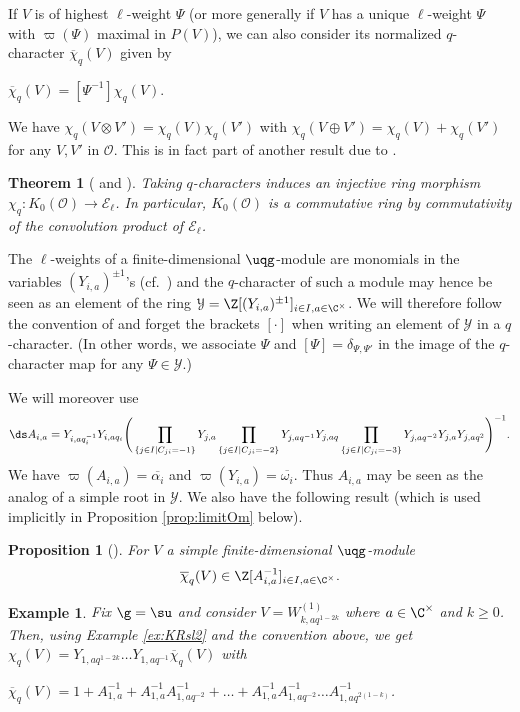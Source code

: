 \documentclass[11pt]{amsart}
\newtheorem{prop}[theorem]{Proposition}
\newtheorem{thm}[theorem]{Theorem}
\newtheorem{example}[theorem]{Example}
\theoremstyle{definition}
\theoremstyle{remark}
\numberwithin{equation}{section}
\begin{document}
If $V$ is of highest $\ell$-weight $\Psi$ (or more generally if $V$ has a unique $\ell$-weight $\Psi$ with $\varpi(\Psi)$ maximal in $P(V)$), we can also consider its normalized $q$-character $\overline{\chi}_q(V)$ given by
\begin{center}
$\overline{\chi}_q(V) = [\Psi^{-1}]\chi_q(V)$.
\end{center}
We have $\chi_q(V\otimes V') = \chi_q(V)\chi_q(V')$ with $\chi_q(V\oplus V') = \chi_q(V)+\chi_q(V')$ for any $V,V'$ in $\mathcal{O}$. This is in fact part of another result due to \cite{hj}.
\begin{thm}[{\cite[Proposition 3.12]{hj}} and {\cite[Theorem 3]{fr}}]\label{thm:qcaract} Taking $q$-characters induces an injective ring morphism $\chi_q : K_0(\mathcal{O}) \rightarrow \mathcal{E}_{\ell}$. In particular, $K_0(\mathcal{O})$ is a commutative ring by commutativity of the convolution product of $\mathcal{E}_{\ell}$.
\end{thm}
The $\ell$-weights of a finite-dimensional $\uqg$-module are monomials in the variables $(Y_{i,a})^{\pm 1}$'s (cf.~\cite{fr}) and the $q$-character of such a module may hence be seen as an element of the ring $\mathcal{Y}=\Z[(Y_{i,a})^{\pm 1}]_{i\in I,a\in \C^{\times}}$. We will therefore follow the convention of \cite{hj,fh1,hl2} and forget the brackets $[\cdot]$ when writing an element of $\mathcal{Y}$ in a $q$-character. (In other words, we associate $\Psi$ and $[\Psi] = \delta_{\Psi,\Psi'}$ in the image of the $q$-character map for any $\Psi \in \mathcal{Y}$.) \par We will moreover use 
$$\ds A_{i,a} = Y_{i,aq_i^{-1}}Y_{i,aq_i}\Bigg(\prod_{\{j\in I| C_{ji}=-1\}} Y_{j,a}\prod_{\{j\in I|C_{ji}=-2\}} Y_{j,aq^{-1}}Y_{j,aq}\prod_{\{j\in I|C_{ji}=-3\}} Y_{j,aq^{-2}}Y_{j,a}Y_{j,aq^2}\Bigg)^{-1}.$$
We have $\varpi(A_{i,a}) = \overline{\alpha_i}$ and $\varpi(Y_{i,a}) = \overline{\omega_i}$. Thus $A_{i,a}$ may be seen as the analog of a simple root in $\mathcal{Y}$. We also have the following result (which is used implicitly in Proposition \ref{prop:limitOm} below).
\begin{prop}[{\cite[Proposition 3]{fr}}] For $V$ a simple finite-dimensional $\uqg$-module $$\overline{\chi}_q(V)\in\Z[A_{i,a}^{-1}]_{i\in I,a\in \C^{\times}}.$$
\end{prop}
\begin{example}\label{ex:qcharW} Fix $\g = \su$ and consider $V = W_{k,aq^{1-2k}}^{(1)}$ where $a \in \C^{\times}$ and $k\geq 0$. Then, using Example \ref{ex:KRsl2} and the convention above, we get $\chi_q(V) = Y_{1,aq^{1-2k}}\dots Y_{1,aq^{-1}}\overline{\chi}_q(V)$ with
\begin{center}
$\overline{\chi}_q(V) = 1+ A_{1,a}^{-1} + A_{1,a}^{-1}A_{1,aq^{-2}}^{-1}+\dots +A_{1,a}^{-1}A_{1,aq^{-2}}^{-1}\dots A_{1,aq^{2(1-k)}}^{-1}$.
\end{center}
\end{example}
\end{document}

